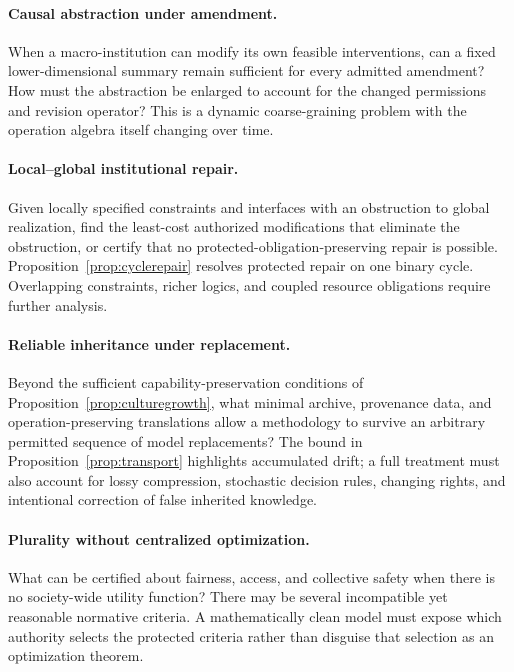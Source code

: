 \documentclass[11pt,letterpaper]{article}
\theoremstyle{plain}
\theoremstyle{definition}
\theoremstyle{remark}
\begin{document}
\paragraph{Causal abstraction under amendment.}
When a macro-institution can modify its own feasible interventions, can a fixed lower-dimensional summary remain sufficient for every admitted amendment? How must the abstraction be enlarged to account for the changed permissions and revision operator? This is a dynamic coarse-graining problem with the operation algebra itself changing over time.

\paragraph{Local--global institutional repair.}
Given locally specified constraints and interfaces with an obstruction to global realization, find the least-cost authorized modifications that eliminate the obstruction, or certify that no protected-obligation-preserving repair is possible. Proposition~\ref{prop:cyclerepair} resolves protected repair on one binary cycle. Overlapping constraints, richer logics, and coupled resource obligations require further analysis.

\paragraph{Reliable inheritance under replacement.}
Beyond the sufficient capability-preservation conditions of Proposition~\ref{prop:culturegrowth}, what minimal archive, provenance data, and operation-preserving translations allow a methodology to survive an arbitrary permitted sequence of model replacements? The bound in Proposition~\ref{prop:transport} highlights accumulated drift; a full treatment must also account for lossy compression, stochastic decision rules, changing rights, and intentional correction of false inherited knowledge.

\paragraph{Plurality without centralized optimization.}
What can be certified about fairness, access, and collective safety when there is no society-wide utility function? There may be several incompatible yet reasonable normative criteria. A mathematically clean model must expose which authority selects the protected criteria rather than disguise that selection as an optimization theorem.
\end{document}
